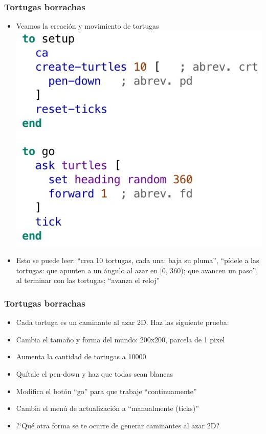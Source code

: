 \documentclass{beamer}
\begin{document}
\begin{frame}[t]
\frametitle{Tortugas borrachas}
\begin{itemize}[<+->]
	\item Veamos la creación y movimiento de tortugas
\includegraphics[width=.5\textwidth]{tortugas_borrachas}
\item Esto se puede leer: ``crea 10 tortugas, cada una: baja su pluma'', ``pídele a las tortugas: que apunten a un ángulo al azar en [0, 360); que avancen un paso'', al terminar con las tortugas: ``avanza el reloj''
\end{itemize}
\end{frame}

\begin{frame}[t]
\frametitle{Tortugas borrachas}
\begin{itemize}[<+->]
	\item Cada tortuga es un caminante al azar 2D. Haz las siguiente prueba:
	\item Cambia el tamaño y forma del mundo: 200x200, parcela de 1 pixel
	\item Aumenta la cantidad de tortugas a 10000
	\item Quítale el pen-down y haz que todas sean blancas
	\item Modifica el botón ``go'' para que trabaje ``continuamente''
	\item Cambia el menú de actualización a ``manualmente (ticks)''
	\item ?`Qué otra forma se te ocurre de generar caminantes al azar 2D?
\end{itemize}
\end{frame}
\end{document}
